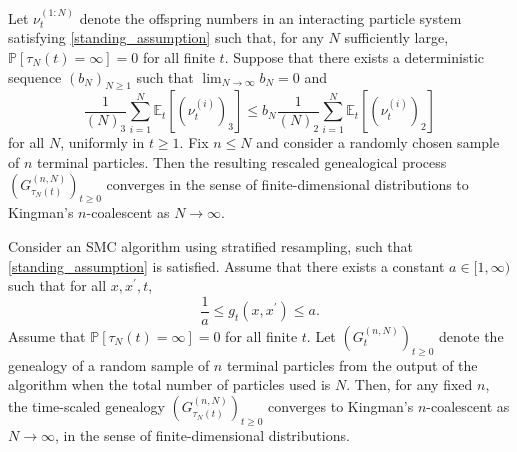 \documentclass{article}
\theoremstyle{definition}
\newcommand{\Prob}{\mathbb{P}}
\newcommand{\Et}{\mathbb{E}_t}
\newcommand{\1}[1]{\mathbbm{1}_{#1}} %
\begin{document}
\begin{theorem}\label{thm:FDDconv}
Let $\nu_t^{(1:N)}$ denote the offspring numbers in an interacting particle system satisfying \ref{standing_assumption} such that, for any $N$ sufficiently large, $\Prob[ \tau_N(t) = \infty ] =0$ for all finite $t$. Suppose that there exists a deterministic sequence $(b_N)_{N\geq1}$ such that ${\lim}_{N\to\infty} b_N =0$ and
\begin{equation}\label{eq:mainthmcond}
\frac{1}{(N)_3} \sum_{i = 1}^N \Et[ (\nu_t^{(i)})_3 ]  \leq b_N \frac{1}{(N)_2} \sum_{i = 1}^N \Et[ (\nu_t^{(i)})_2 ]
\end{equation}
for all $N$, uniformly in $t \geq 1$.
Fix $n\leq N$ and consider a randomly chosen sample of $n$ terminal particles.
Then the resulting rescaled genealogical process $(G_{\tau_N(t)}^{(n,N)})_{t\geq0}$ converges in the sense of finite-dimensional distributions to Kingman's $n$-coalescent as $N \to \infty$.
\end{theorem}

\begin{corollary}\label{thm:stratified}
Consider an SMC algorithm using stratified resampling, such that \ref{standing_assumption} is satisfied.
Assume that there exists a constant $a\in [1,\infty)$ such that for all $x, x^\prime, t$,
\begin{equation}\label{eq:gq_bounds_sr}
\frac{1}{a} \leq g_t(x, x^\prime) \leq a .
\end{equation}
Assume that $\Prob[ \tau_N(t) = \infty] =0$ for all finite $t$.
Let $(G_t^{(n,N)})_{t\geq0}$ denote the genealogy of a random sample of $n$ terminal particles from the output of the algorithm when the total number of particles used is $N$. Then, for any fixed $n$, the time-scaled genealogy $(G_{\tau_N(t)}^{(n,N)})_{t\geq0}$ converges to Kingman's $n$-coalescent as $N\to \infty$, in the sense of finite-dimensional distributions.
\end{corollary}
\end{document}
